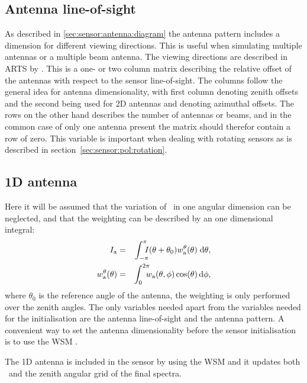 \subsection{Antenna line-of-sight}
As described in \ref{sec:sensor:antenna:diagram} the antenna pattern includes a dimension for different viewing directions. This is useful when simulating multiple antennas or a multiple beam antenna. The viewing directions are described in ARTS by . This is a one- or two column matrix describing the relative offset of the antennas with respect to the sensor line-of-sight. The columns follow the general idea for antenna dimensionality, with first column denoting zenith offsets and the second being used for 2D antennas and denoting azimuthal offsets. The rows on the other hand describes the number of antennas or beams, and in the common case of only one antenna present the matrix should therefor contain a row of zero.
This variable is important when dealing with rotating sensors as is described in section~\ref{sec:sensor:pol:rotation}.

\subsection{1D antenna}
Here it will be assumed that the variation of \Mpi\ in one angular dimension can be neglected, and that the weighting can be described by an one dimensional integral:
\begin{eqnarray}
\label{eq:sensor:antenna:1D}
  \aMpi{\mathrm{a}} &=& \int_{-\pi}^\pi\!\!\!\!I(\theta+\theta_0) 
  w_\mathrm{a}^\theta(\theta)\;\mathrm{d}\theta,\\
  w_\mathrm{a}^\theta(\theta) &=& \int_0^{2\pi}\!\!\!\!
  w_\mathrm{a}(\theta,\phi)\cos(\theta)\,\mathrm{d}\phi,
\end{eqnarray}
where $\theta_0$ is the reference angle of the antenna, the weighting is only performed over the zenith angles. The only variables needed apart from the variables needed for the initialisation are the antenna line-of-sight and the antenna pattern. A convenient way to set the antenna dimensionality before the sensor initialisation is to use the WSM .

The 1D antenna is included in the sensor by using the WSM  and it updates both \SnsMtr\ and the zenith angular grid of the final spectra.


